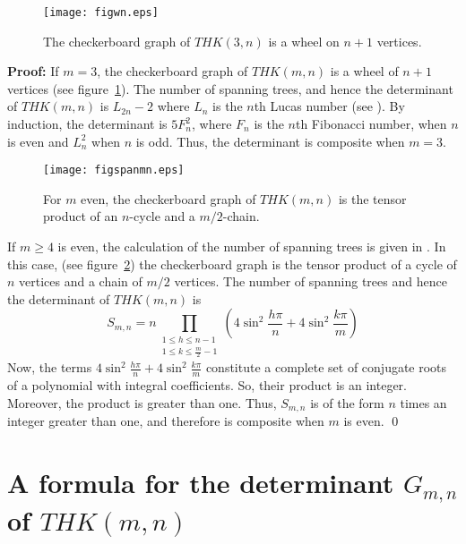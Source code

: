 \documentclass{amsart}
\begin{document}
\setcounter{thm}{8}

\begin{figure}[ht]
\begin{center}
\texttt{[image: figwn.eps]}
\caption{The checkerboard graph of $THK(3,n)$ is a wheel on $n+1$ vertices.}\label{figwn}
\end{center}
\end{figure} 

{\noindent \textbf{Proof: }}
If $m = 3$, the checkerboard graph of $THK(m,n)$ is a wheel of 
$n+1$ vertices (see figure~\ref{figwn}). The number of spanning trees, and hence the determinant of $THK(m,n)$ 
is $L_{2n} -2$ where $L_n$ is the $n$th Lucas number (see \cite{R}).
By induction, the determinant is $5 F_n^2$, where $F_n$ is the $n$th Fibonacci number, when $n$ is 
even and $L_n^2$ when $n$ is odd. Thus, the determinant is composite 
when $m = 3$.

\begin{figure}[ht]
\begin{center}
\texttt{[image: figspanmn.eps]}
\caption{For $m$ even, the checkerboard graph of $THK(m,n)$ is the tensor product of an $n$-cycle and a $m/2$-chain.}\label{figspanmn}
\end{center}
\end{figure} 

If $m \geq 4$ is even, the calculation of the number of spanning trees is
given in \cite{K}. In this case, (see figure~\ref{figspanmn}) the checkerboard graph is the tensor product of a cycle of $n$ vertices and a chain of $m/2$ vertices.  The number of spanning trees and hence the determinant of
$THK(m,n)$ is
$$S_{m,n} = n \prod_{\begin{array}{c}
1 \leq h \leq n-1 \\ 1 \leq k \leq \frac{m}{2} -1 \end{array}}
(4 \sin^2 \frac{h \pi}{n} + 4 \sin^2 \frac{k \pi}{m})$$
Now, the terms $4 \sin^2 \frac{h \pi}{n} + 4 \sin^2 \frac{k \pi}{m}$ constitute a complete set of conjugate roots of a polynomial with integral coefficients. 
So, their product is an integer. Moreover,  the product is greater than one. Thus, 
$S_{m,n}$ is of the form $n$ times an integer greater than one, and therefore is composite when $m$ is even. {\qed}

\section{A formula for the determinant $G_{m,n}$ of $THK(m,n)$}
\end{document}
